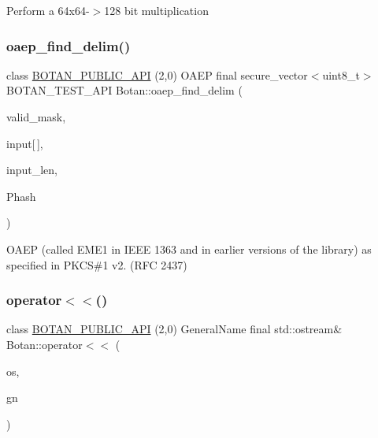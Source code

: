 Perform a 64x64-\/$>$128 bit multiplication \mbox{\label{namespace_botan_a9f4036fc0551d10598b35ff39b67042b}} 
\subsubsection{\texorpdfstring{oaep\+\_\+find\+\_\+delim()}{oaep\_find\_delim()}}
{\footnotesize\ttfamily class \hyperlink{namespace_botan_a6b9388030d872e586a4655b776ac9501}{B\+O\+T\+A\+N\+\_\+\+P\+U\+B\+L\+I\+C\+\_\+\+A\+PI} (2,0) O\+A\+EP final secure\+\_\+vector$<$uint8\+\_\+t$>$ B\+O\+T\+A\+N\+\_\+\+T\+E\+S\+T\+\_\+\+A\+PI Botan\+::oaep\+\_\+find\+\_\+delim (\begin{DoxyParamCaption}\item[{uint8\+\_\+t \&}]{valid\+\_\+mask,  }\item[{const uint8\+\_\+t}]{input\mbox{[}$\,$\mbox{]},  }\item[{size\+\_\+t}]{input\+\_\+len,  }\item[{const secure\+\_\+vector$<$ uint8\+\_\+t $>$ \&}]{Phash }\end{DoxyParamCaption})\hspace{0.3cm}{\ttfamily [final]}}

O\+A\+EP (called E\+M\+E1 in I\+E\+EE 1363 and in earlier versions of the library) as specified in P\+K\+CS\#1 v2. (R\+FC 2437) \mbox{\label{namespace_botan_a531e8b424a3517716470e1e2f6989907}} 
\subsubsection{\texorpdfstring{operator$<$$<$()}{operator<<()}\hspace{0.1cm}{\footnotesize\ttfamily [1/2]}}
{\footnotesize\ttfamily class \hyperlink{namespace_botan_a6b9388030d872e586a4655b776ac9501}{B\+O\+T\+A\+N\+\_\+\+P\+U\+B\+L\+I\+C\+\_\+\+A\+PI} (2,0) General\+Name final std\+::ostream\& Botan\+::operator$<$$<$ (\begin{DoxyParamCaption}\item[{std\+::ostream \&}]{os,  }\item[{const General\+Name \&}]{gn }\end{DoxyParamCaption})\hspace{0.3cm}{\ttfamily [final]}}



